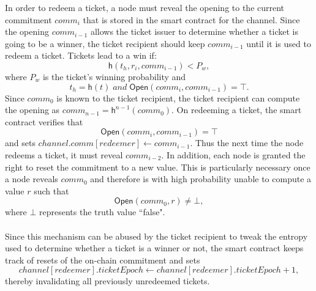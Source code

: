 In order to redeem a ticket, a node must reveal the opening to the current
commitment $comm_i$ that is stored in the smart contract for the channel. Since
the opening $comm_{i-1}$ allows the ticket issuer to determine whether a ticket
is going to be a winner, the ticket recipient should keep $comm_{i-1}$ until it is
used to redeem a ticket. Tickets lead to a win if: $$\mathsf{h}( t_h, r_i,
comm_{i-1} ) < P_w,$$ where $P_w$ is the ticket's winning probability and
$$t_h=\mathsf{h}(t) \;and\; \mathsf{Open}(comm_i, comm_{i-1}) = \top.$$ Since
$comm_{0}$ is known to the ticket recipient, the ticket recipient can compute
the opening as $comm_{n-1} = \mathsf{h}^{n-1}(comm_0)$. On redeeming a ticket,
the smart contract verifies that $$\mathsf{Open}(comm_i, comm_{i-1}) = \top$$
and sets $channel.comm[redeemer] \leftarrow comm_{i-1}$. Thus the next time the
node redeems a ticket, it must reveal $comm_{i-2}$. In addition, each node is
granted the right to reset the commitment to a new value. This is particularly necessary
once a node reveals $comm_0$ and therefore is with high probability
unable to compute a value $r$ such that $$\mathsf{Open}(comm_0,r) \neq \bot,$$
where $\bot$ represents the truth value ``false". \\~\\Since this mechanism can
be abused by the ticket recipient to tweak the entropy used to determine
whether a ticket is a winner or not, the smart contract keeps track of resets of
the on-chain commitment and sets $$channel[redeemer].ticketEpoch \leftarrow
channel[redeemer].ticketEpoch +1 ,$$ thereby invalidating all previously
unredeemed tickets.
